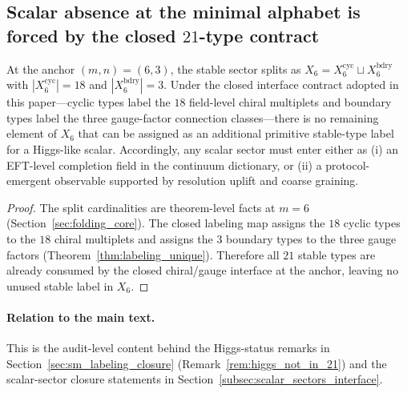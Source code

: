 \subsection{Scalar absence at the minimal alphabet is forced by the closed \texorpdfstring{$21$}{21}-type contract}
\label{subsec:forced_scalar_absence}

\begin{proposition}[No additional primitive stable type remains for a Higgs label at \texorpdfstring{$m=6$}{m=6}]
\label{prop:higgs_not_in_x6_forced}
At the anchor $(m,n)=(6,3)$, the stable sector splits as $X_6=X_6^{\mathrm{cyc}}\sqcup X_6^{\mathrm{bdry}}$ with $|X_6^{\mathrm{cyc}}|=18$ and $|X_6^{\mathrm{bdry}}|=3$.
Under the closed interface contract adopted in this paper---cyclic types label the $18$ field-level chiral multiplets and boundary types label the three gauge-factor connection classes---there is no remaining element of $X_6$ that can be assigned as an additional primitive stable-type label for a Higgs-like scalar.
Accordingly, any scalar sector must enter either as (i) an EFT-level completion field in the continuum dictionary, or (ii) a protocol-emergent observable supported by resolution uplift and coarse graining.
\end{proposition}
\begin{proof}
The split cardinalities are theorem-level facts at $m=6$ (Section~\ref{sec:folding_core}).
The closed labeling map assigns the $18$ cyclic types to the $18$ chiral multiplets and assigns the $3$ boundary types to the three gauge factors (Theorem~\ref{thm:labeling_unique}).
Therefore all $21$ stable types are already consumed by the closed chiral/gauge interface at the anchor, leaving no unused stable label in $X_6$.
\end{proof}

\paragraph{Relation to the main text.}
This is the audit-level content behind the Higgs-status remarks in Section~\ref{sec:sm_labeling_closure} (Remark~\ref{rem:higgs_not_in_21}) and the scalar-sector closure statements in Section~\ref{subsec:scalar_sectors_interface}.


